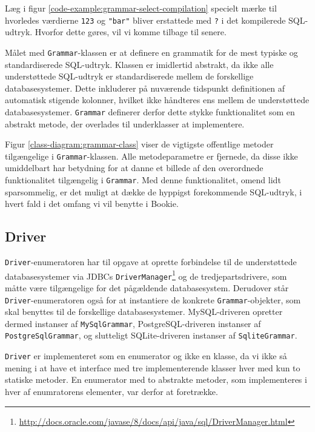 Læg i figur \ref{code-example:grammar-select-compilation} specielt mærke til hvorledes værdierne \texttt{123} og \texttt{"bar"} bliver erstattede med \texttt{?} i det kompilerede SQL-udtryk. Hvorfor dette gøres, vil vi komme tilbage til senere.

Målet med \texttt{Grammar}-klassen er at definere en grammatik for de mest typiske og standardiserede SQL-udtryk. Klassen er imidlertid abstrakt, da ikke alle understøttede SQL-udtryk er standardiserede mellem de forskellige databasesystemer. Dette inkluderer på nuværende tidspunkt definitionen af automatisk stigende kolonner, hvilket ikke håndteres ens mellem de understøttede databasesystemer. \texttt{Grammar} definerer derfor dette stykke funktionalitet som en abstrakt metode, der overlades til underklasser at implementere.

Figur \ref{class-diagram:grammar-class} viser de vigtigste offentlige metoder tilgængelige i \texttt{Grammar}-klassen. Alle metodeparametre er fjernede, da disse ikke umiddelbart har betydning for at danne et billede af den overordnede funktionalitet tilgængelig i \texttt{Grammar}. Med denne funktionalitet, omend lidt sparsommelig, er det muligt at dække de hyppigst forekommende SQL-udtryk, i hvert fald i det omfang vi vil benytte i Bookie.

\subsection{Driver}

\texttt{Driver}-enumeratoren har til opgave at oprette forbindelse til de understøttede databasesystemer via JDBCs \texttt{DriverManager}\footnote{\url{http://docs.oracle.com/javase/8/docs/api/java/sql/DriverManager.html}} og de tredjepartsdrivere, som måtte være tilgængelige for det pågældende databasesystem. Derudover står \texttt{Driver}-enumeratoren også for at instantiere de konkrete \texttt{Grammar}-objekter, som skal benyttes til de forskellige databasesystemer. MySQL-driveren opretter dermed instanser af \texttt{MySqlGrammar}, PostgreSQL-driveren instanser af \texttt{PostgreSqlGrammar}, og slutteligt SQLite-driveren instanser af \texttt{SqliteGrammar}.

\texttt{Driver} er implementeret som en enumerator og ikke en klasse, da vi ikke så mening i at have et interface med tre implementerende klasser hver med kun to statiske metoder. En enumerator med to abstrakte metoder, som implementeres i hver af enumratorens elementer, var derfor at foretrække.

